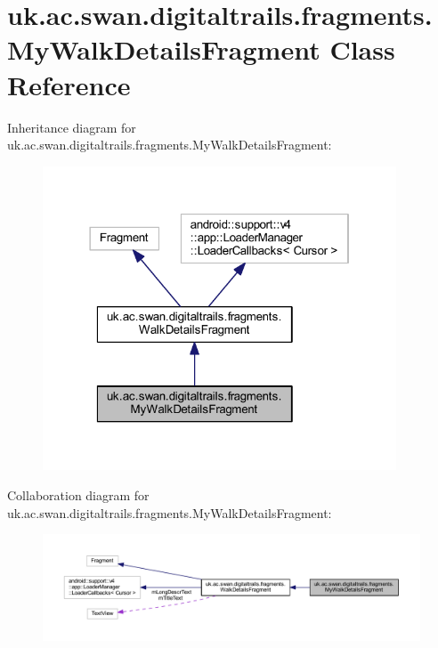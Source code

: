 \hypertarget{classuk_1_1ac_1_1swan_1_1digitaltrails_1_1fragments_1_1_my_walk_details_fragment}{\section{uk.\+ac.\+swan.\+digitaltrails.\+fragments.\+My\+Walk\+Details\+Fragment Class Reference}
\label{classuk_1_1ac_1_1swan_1_1digitaltrails_1_1fragments_1_1_my_walk_details_fragment}
}


Inheritance diagram for uk.\+ac.\+swan.\+digitaltrails.\+fragments.\+My\+Walk\+Details\+Fragment\+:\nopagebreak
\begin{figure}[H]
\begin{center}
\leavevmode
\includegraphics[width=298pt]{classuk_1_1ac_1_1swan_1_1digitaltrails_1_1fragments_1_1_my_walk_details_fragment__inherit__graph}
\end{center}
\end{figure}


Collaboration diagram for uk.\+ac.\+swan.\+digitaltrails.\+fragments.\+My\+Walk\+Details\+Fragment\+:\nopagebreak
\begin{figure}[H]
\begin{center}
\leavevmode
\includegraphics[width=350pt]{classuk_1_1ac_1_1swan_1_1digitaltrails_1_1fragments_1_1_my_walk_details_fragment__coll__graph}
\end{center}
\end{figure}
